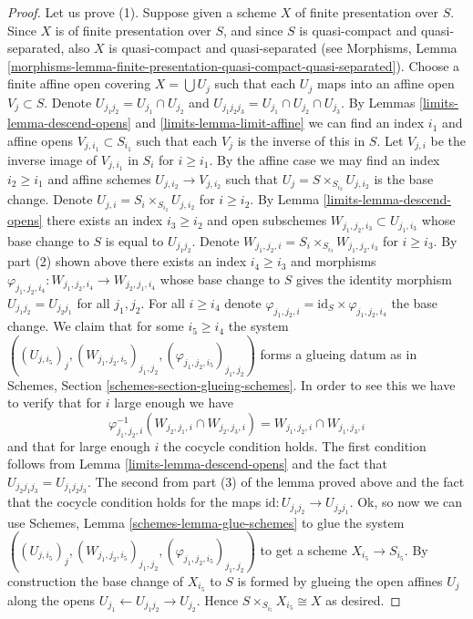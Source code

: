 \begin{proof}
\medskip\noindent
Let us prove (1). Suppose given a scheme $X$ of finite presentation
over $S$. Since $X$ is of finite presentation
over $S$, and since $S$ is quasi-compact and quasi-separated, also
$X$ is quasi-compact and quasi-separated
(see Morphisms,
Lemma \ref{morphisms-lemma-finite-presentation-quasi-compact-quasi-separated}).
Choose a finite affine open covering $X = \bigcup U_j$
such that each $U_j$ maps into an affine open $V_j \subset S$.
Denote $U_{j_1j_2} = U_{j_1} \cap U_{j_2}$ and
$U_{j_1j_2j_3} = U_{j_1} \cap U_{j_2} \cap U_{j_3}$.
By Lemmas \ref{limits-lemma-descend-opens} and \ref{limits-lemma-limit-affine}
we can find an index $i_1$ and affine opens $V_{j, i_1} \subset S_{i_1}$
such that each $V_j$ is the inverse of this in $S$.
Let $V_{j, i}$ be the inverse image of $V_{j, i_1}$ in $S_i$ for
$i \geq i_1$. By the affine case we may find an index $i_2 \geq i_1$ and
affine schemes $U_{j, i_2} \to V_{j, i_2}$ such
that $U_j = S \times_{S_{i_2}} U_{j, i_2}$ is the base change.
Denote $U_{j, i} = S_i \times_{S_{i_2}} U_{j, i_2}$ for $i \geq i_2$.
By Lemma \ref{limits-lemma-descend-opens} there exists an index
$i_3 \geq i_2$ and open subschemes
$W_{j_1, j_2, i_3} \subset U_{j_1, i_3}$
whose base change to $S$ is equal to $U_{j_1j_2}$.
Denote $W_{j_1, j_2, i} = S_i \times_{S_{i_3}} W_{j_1, j_2, i_3}$
for $i \geq i_3$. By part (2) shown above there exists an index
$i_4 \geq i_3$ and morphisms
$\varphi_{j_1, j_2, i_4} : W_{j_1, j_2, i_4} \to W_{j_2, j_1, i_4}$
whose base change to $S$ gives the identity morphism
$U_{j_1j_2} = U_{j_2j_1}$ for all $j_1, j_2$.
For all $i \geq i_4$ denote
$\varphi_{j_1, j_2, i} = \text{id}_S \times \varphi_{j_1, j_2, i_4}$
the base change. We claim that for some $i_5 \geq i_4$ the system
$((U_{j, i_5})_j, (W_{j_1, j_2, i_5})_{j_1, j_2},
(\varphi_{j_1, j_2, i_5})_{j_1, j_2})$ forms a glueing datum
as in Schemes, Section \ref{schemes-section-glueing-schemes}.
In order to see this we have to verify that for $i$ large enough
we have
$$
\varphi_{j_1, j_2, i}^{-1}(W_{j_2, j_1, i} \cap W_{j_2, j_3, i})
=
W_{j_1, j_2, i} \cap W_{j_1, j_3, i}
$$
and that for large enough $i$ the cocycle condition holds.
The first condition follows from Lemma \ref{limits-lemma-descend-opens}
and the fact that $U_{j_2j_1j_3} = U_{j_1j_2j_3}$.
The second from part (3) of the lemma proved above and the fact
that the cocycle condition holds for the maps
$\text{id} : U_{j_1j_2} \to U_{j_2j_1}$.
Ok, so now we can use Schemes, Lemma \ref{schemes-lemma-glue-schemes}
to glue the system
$((U_{j, i_5})_j, (W_{j_1, j_2, i_5})_{j_1, j_2},
(\varphi_{j_1, j_2, i_5})_{j_1, j_2})$ to get a scheme
$X_{i_5} \to S_{i_5}$. By construction the base change of
$X_{i_5}$ to $S$ is formed by glueing the open affines
$U_j$ along the opens $U_{j_1} \leftarrow U_{j_1j_2} \rightarrow U_{j_2}$.
Hence $S \times_{S_{i_5}} X_{i_5} \cong X$ as desired.
\end{proof}

